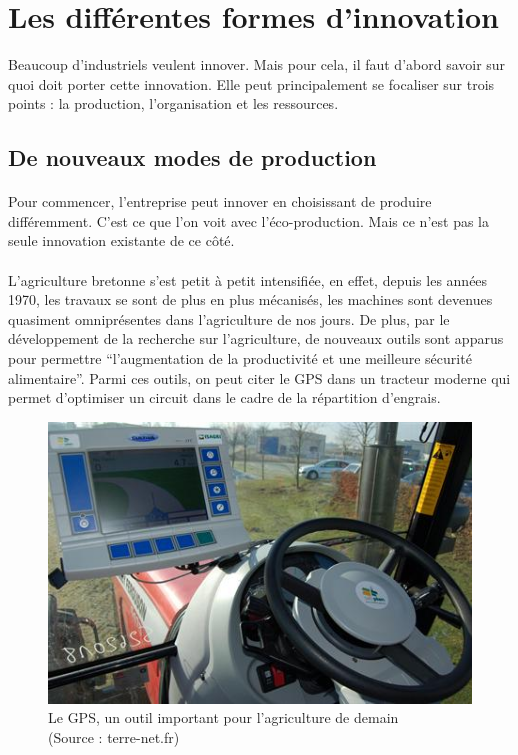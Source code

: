 \documentclass[a4paper,12pt]{report}
\begin{document}
	\section{Les différentes formes d'innovation}
		Beaucoup d'industriels veulent innover. Mais pour cela, il faut d'abord savoir sur quoi doit porter cette innovation. Elle peut principalement se focaliser sur trois points : la production, l'organisation et les ressources.
	
		\subsection{De nouveaux modes de production}
			\paragraph{}Pour commencer, l'entreprise peut innover en choisissant de produire différemment. C'est ce que l'on voit avec l'éco-production. Mais ce n'est pas la seule innovation existante de ce côté.
			
			\paragraph{}L’agriculture bretonne s’est petit à petit intensifiée, en effet, depuis les années 1970, les travaux se sont de plus en plus mécanisés, les machines sont devenues quasiment omniprésentes dans l’agriculture de nos jours. De plus, par le développement de la recherche sur l’agriculture, de nouveaux outils sont apparus pour permettre “l’augmentation de la productivité et une meilleure sécurité alimentaire”\cite{FAOStatisticalYearbook2013}. Parmi ces outils, on peut citer le GPS dans un tracteur moderne\cite{RobotsChamps} qui permet d’optimiser un circuit dans le cadre de la répartition d’engrais.
			
			\begin{figure}[!h]
			\centering
			\includegraphics[width = 200 pt]{Illustrations/GPS_Tracteur.jpg}
			\caption{Le GPS, un outil important pour l'agriculture de demain\\(Source : terre-net.fr\cite{GPSEtTracteur})}
			\label{GPSTracteur}
			\end{figure}
			
\end{document}
